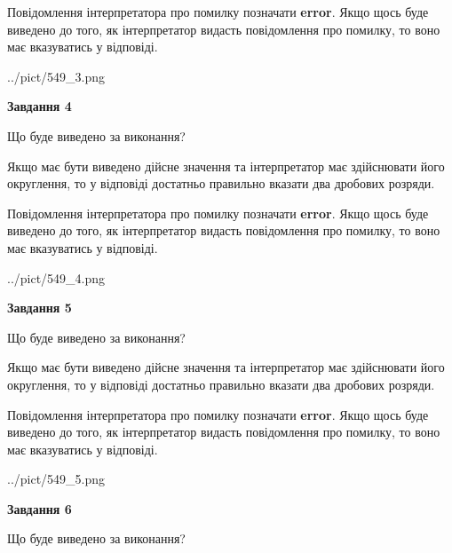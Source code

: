 \documentclass[12pt, ukrainian]{article}
\begin{document}
{\begin {Large}
Повідомлення інтерпретатора про помилку позначати \textbf{error}.
Якщо щось буде виведено до того, як інтерпретатор видасть повідомлення про помилку, 
то воно має вказуватись у відповіді. \par

\begin{center}
	{../pict/549_3.png}
\end{center}
\newpage

{\begin {center}\textbf{Завдання 4}\end {center}}\par
Що буде виведено за виконання? \par

Якщо має бути виведено дійсне значення та інтерпретатор має здійснювати його округлення, 
то у відповіді достатньо правильно вказати два дробових розряди.

Повідомлення інтерпретатора про помилку позначати \textbf{error}.
Якщо щось буде виведено до того, як інтерпретатор видасть повідомлення про помилку, 
то воно має вказуватись у відповіді. \par

\begin{center}
	{../pict/549_4.png}
\end{center}
\newpage

{\begin {center}\textbf{Завдання 5}\end {center}}\par
Що буде виведено за виконання? \par

Якщо має бути виведено дійсне значення та інтерпретатор має здійснювати його округлення, 
то у відповіді достатньо правильно вказати два дробових розряди.

Повідомлення інтерпретатора про помилку позначати \textbf{error}.
Якщо щось буде виведено до того, як інтерпретатор видасть повідомлення про помилку, 
то воно має вказуватись у відповіді. \par

\begin{center}
	{../pict/549_5.png}
\end{center}
\newpage

{\begin {center}\textbf{Завдання 6}\end {center}}\par
Що буде виведено за виконання? \par


\end{Large}}
\end{document}
